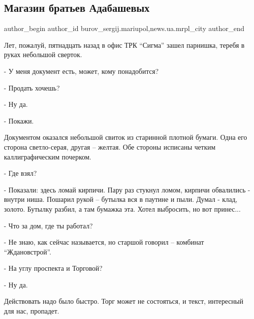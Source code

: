  
 
 
 
 
 
\subsection{Магазин братьев Адабашевых}
\label{sec:10_12_2016.stz.news.ua.mrpl_city.1.magazin_bratjev_adabashevyh}
 
\ifcmt
 author_begin
   author_id burov_sergij.mariupol,news.ua.mrpl_city
 author_end
\fi


Лет, пожалуй, пятнадцать назад в офис ТРК \enquote{Сигма} зашел парнишка, теребя в руках небольшой сверток.

- У меня документ есть, может, кому понадобится?

- Продать хочешь?

- Ну да.

- Покажи.

Документом оказался небольшой свиток из старинной плотной бумаги. Одна его
сторона светло-серая, другая – желтая. Обе стороны исписаны четким
каллиграфическим почерком.

- Где взял?

- Показали: здесь ломай кирпичи. Пару раз стукнул ломом, кирпичи обвалились -
внутри ниша. Пошарил рукой – бутылка вся в паутине и пыли. Думал - клад,
золото. Бутылку разбил, а там бумажка эта. Хотел выбросить, но вот принес...

- Что за дом, где ты работал?

- Не знаю, как сейчас называется, но старшой говорил – комбинат \enquote{Ждановстрой}.

- На углу проспекта и Торговой?

- Ну да.


Действовать надо было быстро. Торг может не состояться, и текст, интересный для нас, пропадет.

